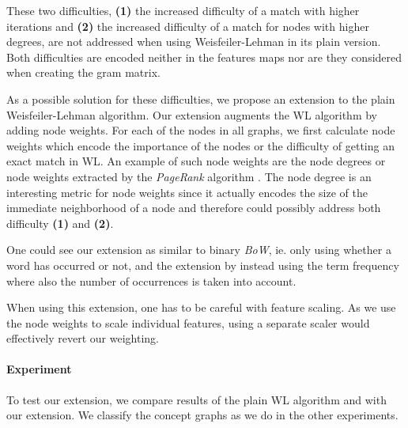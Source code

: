 These two difficulties, \textbf{(1)} the increased difficulty of a match with higher iterations and \textbf{(2)} the increased difficulty of a match for nodes with higher degrees, are not addressed when using Weisfeiler-Lehman in its plain version. Both difficulties are encoded neither in the features maps nor are they considered when creating the gram matrix.

As a possible solution for these difficulties, we propose an extension to the plain Weisfeiler-Lehman algorithm.
Our extension augments the WL algorithm by adding node weights.
For each of the nodes in all graphs, we first calculate node weights which encode the importance of the nodes or the difficulty of getting an exact match in WL.
An example of such node weights are the node degrees or node weights extracted by the \textit{PageRank} algorithm \cite{Page1998}.
The node degree is an interesting metric for node weights since it actually encodes the size of the immediate neighborhood of a node and therefore could possibly address both difficulty \textbf{(1)} and \textbf{(2)}.

One could see our extension as similar to binary \textit{BoW}, ie. only using whether a word has occurred or not, and the extension by instead using the term frequency where also the number of occurrences is taken into account.

When using this extension, one has to be careful with feature scaling. As we use the node weights to scale individual features, using a separate scaler would effectively revert our weighting.


\paragraph{Experiment}
To test our extension, we compare results of the plain WL algorithm and with our extension.
We classify the concept graphs as we do in the other experiments.

